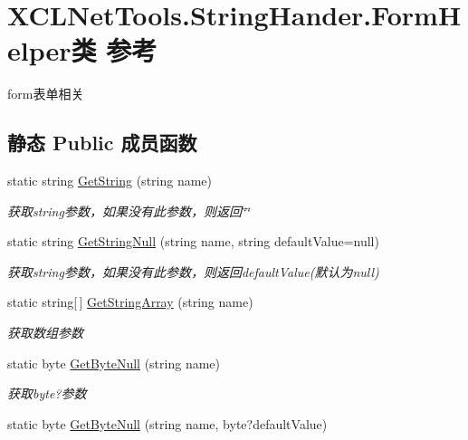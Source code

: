 \hypertarget{class_x_c_l_net_tools_1_1_string_hander_1_1_form_helper}{}\section{X\+C\+L\+Net\+Tools.\+String\+Hander.\+Form\+Helper类 参考}
\label{class_x_c_l_net_tools_1_1_string_hander_1_1_form_helper}


form表单相关  


\subsection*{静态 Public 成员函数}
\begin{DoxyCompactItemize}
\item 
static string \hyperlink{class_x_c_l_net_tools_1_1_string_hander_1_1_form_helper_a8c34c5210ad29ea122ee8320b4f14f9f}{Get\+String} (string name)
\begin{DoxyCompactList}\small\item\em 获取string参数，如果没有此参数，则返回\char`\"{}\char`\"{} \end{DoxyCompactList}\item 
static string \hyperlink{class_x_c_l_net_tools_1_1_string_hander_1_1_form_helper_a953f8f717a6b0b26541f0a06c99fe19c}{Get\+String\+Null} (string name, string default\+Value=null)
\begin{DoxyCompactList}\small\item\em 获取string参数，如果没有此参数，则返回default\+Value(默认为null) \end{DoxyCompactList}\item 
static string\mbox{[}$\,$\mbox{]} \hyperlink{class_x_c_l_net_tools_1_1_string_hander_1_1_form_helper_a9b7680e6e7975889a62f273eaacdf37c}{Get\+String\+Array} (string name)
\begin{DoxyCompactList}\small\item\em 获取数组参数 \end{DoxyCompactList}\item 
static byte \hyperlink{class_x_c_l_net_tools_1_1_string_hander_1_1_form_helper_a9d43824d313342bfc66623f548ad6ad6}{Get\+Byte\+Null} (string name)
\begin{DoxyCompactList}\small\item\em 获取byte?参数 \end{DoxyCompactList}\item 
static byte \hyperlink{class_x_c_l_net_tools_1_1_string_hander_1_1_form_helper_a4b2dafb903bedae1af30683209520136}{Get\+Byte\+Null} (string name, byte?default\+Value)

\end{DoxyCompactItemize}
